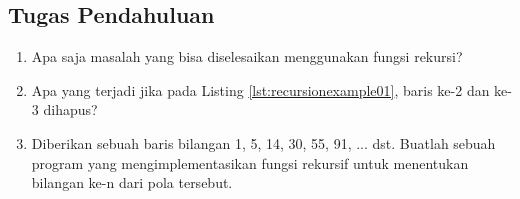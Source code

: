 \subsection{Tugas Pendahuluan}
\begin{enumerate}
    \item Apa saja masalah yang bisa diselesaikan menggunakan fungsi rekursi?
    \item Apa yang terjadi jika pada Listing \ref{lst:recursionexample01}, baris ke-2 dan ke-3 dihapus?
    \item Diberikan sebuah baris bilangan 1, 5, 14, 30, 55, 91, ... dst. Buatlah sebuah program yang mengimplementasikan fungsi rekursif untuk menentukan bilangan ke-n dari pola tersebut.
\end{enumerate}